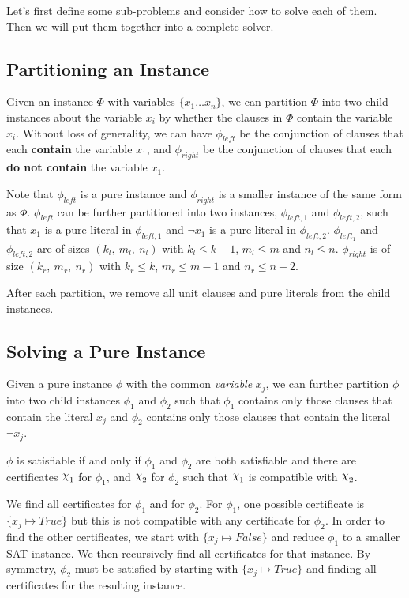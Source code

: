 Let's first define some sub-problems and consider how to solve each of them.
Then we will put them together into a complete solver.

\subsection{Partitioning an Instance}
\label{subsec:partitioning-an-instance}

Given an instance $\Phi$ with variables $\{ x_1 \dots x_n \}$, we can partition $\Phi$ into two child instances about the variable $x_i$ by whether the clauses in $\Phi$ contain the variable $x_i$.
Without loss of generality, we can have $\phi_{left}$ be the conjunction of clauses that each \textbf{contain} the variable $x_1$, and $\phi_{right}$ be the conjunction of clauses that each \textbf{do not contain} the variable $x_1$.

Note that $\phi_{left}$ is a pure instance and $\phi_{right}$ is a smaller instance of the same form as $\Phi$.
$\phi_{left}$ can be further partitioned into two instances, $\phi_{left, 1}$ and $\phi_{left, 2}$, such that $x_1$ is a pure literal in $\phi_{left, 1}$ and $\lnot x_1$ is a pure literal in $\phi_{left, 2}$.
$\phi_{left_1}$ and $\phi_{left, 2}$ are of sizes $(k_l,~ m_l,~ n_l)$ with $k_l \leq k - 1$, $m_l \leq m$ and $n_l \leq n$.
$\phi_{right}$ is of size $(k_r,~ m_r,~ n_r)$ with $k_r \leq k$, $m_r \leq m - 1$ and $n_r \leq n - 2$.

After each partition, we remove all unit clauses and pure literals from the child instances.

\subsection{Solving a Pure Instance}
\label{subsec:solving-a-pure-instance}

Given a pure instance $\phi$ with the common \textit{variable} $x_j$, we can further partition $\phi$ into two child instances $\phi_1$ and $\phi_2$ such that $\phi_1$ contains only those clauses that contain the literal $x_j$ and $\phi_2$ contains only those clauses that contain the literal $\lnot x_j$.

$\phi$ is satisfiable if and only if $\phi_1$ and $\phi_2$ are both satisfiable and there are certificates $\rchi_1$ for $\phi_1$, and $\rchi_2$ for $\phi_2$ such that $\rchi_1$ is compatible with $\rchi_2$.

We find all certificates for $\phi_1$ and for $\phi_2$.
For $\phi_1$, one possible certificate is $\{ x_j \mapsto True \}$ but this is not compatible with any certificate for $\phi_2$.
In order to find the other certificates, we start with $\{ x_j \mapsto False \}$ and reduce $\phi_1$ to a smaller SAT instance.
We then recursively find all certificates for that instance.
By symmetry, $\phi_2$ must be satisfied by starting with $\{ x_j \mapsto True \}$ and finding all certificates for the resulting instance.


